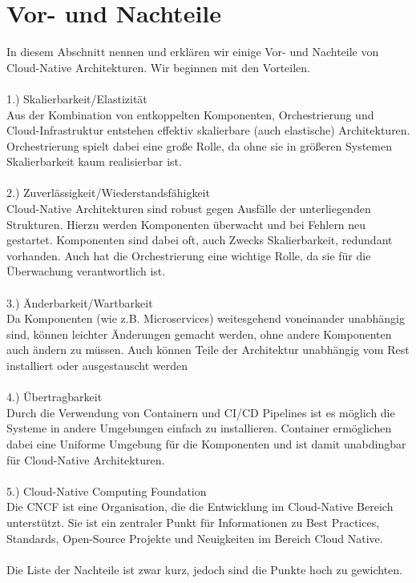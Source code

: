 \section{Vor- und Nachteile}
In diesem Abschnitt nennen und erklären wir einige Vor- und Nachteile von Cloud-Native Architekturen. Wir beginnen mit den Vorteilen.\\
\\
1.) Skalierbarkeit/Elastizität\\
Aus der Kombination von entkoppelten Komponenten, Orchestrierung und Cloud-Infrastruktur entstehen effektiv skalierbare (auch elastische) Architekturen. Orchestrierung spielt dabei eine große Rolle, da ohne sie in größeren Systemen Skalierbarkeit kaum realisierbar ist.\\
\\
2.) Zuverlässigkeit/Wiederstandsfähigkeit\\
Cloud-Native Architekturen sind robust gegen Ausfälle der unterliegenden Strukturen. Hierzu werden Komponenten überwacht und bei Fehlern neu gestartet. Komponenten sind dabei oft, auch Zwecks Skalierbarkeit, redundant vorhanden. Auch hat die Orchestrierung eine wichtige Rolle, da sie für die Überwachung verantwortlich ist.\\
\\
3.) Änderbarkeit/Wartbarkeit\\
Da Komponenten (wie z.B. Microservices) weitesgehend voneinander unabhängig sind, können leichter Änderungen gemacht werden, ohne andere Komponenten auch ändern zu müssen. Auch können Teile der Architektur unabhängig vom Rest installiert oder ausgestauscht werden\\
\\
4.) Übertragbarkeit\\
Durch die Verwendung von Containern und CI/CD Pipelines ist es möglich die Systeme in andere Umgebungen einfach zu installieren. Container ermöglichen dabei eine Uniforme Umgebung für die Komponenten und ist damit unabdingbar für Cloud-Native Architekturen. \\
\\
5.) Cloud-Native Computing Foundation\\
Die CNCF ist eine Organisation, die die Entwicklung im Cloud-Native Bereich unterstützt. Sie ist ein zentraler Punkt für Informationen zu Best Practices, Standards, Open-Source Projekte und Neuigkeiten im Bereich Cloud Native.\\
\\
Die Liste der Nachteile ist zwar kurz, jedoch sind die Punkte hoch zu gewichten.\\
